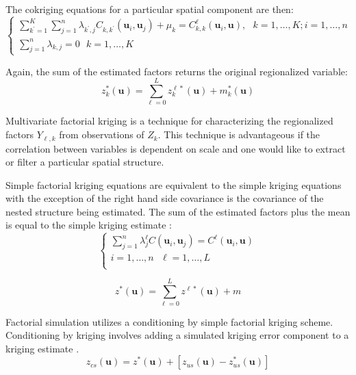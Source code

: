 The cokriging equations for a particular spatial component are then:
\begin{equation*}
    \begin{cases}
        \sum_{k^{\prime}=1}^{K} \sum_{j=1}^{n} \lambda_{k^{\prime},j} C_{k,k^{\prime}}(\mathbf{u}_{i}, \mathbf{u}_{j}) + \mu_{k} = C_{k,k}^{\ell}(\mathbf{u}_{i},\mathbf{u}), \ \ \ k=1,\dots,K; i=1,\dots,n \\
        \sum_{j=1}^{n} \lambda_{k,j} = 0  \ \ \ k=1,\dots,K
    \end{cases}
\end{equation*}

Again, the sum of the estimated factors returns the original regionalized variable:
\begin{equation*}
    z^{*}_{k}(\mathbf{u}) = \sum_{\ell=0}^{L} z^{\ell*}_{k}(\mathbf{u}) + m^{*}_{k}(\mathbf{u})
\end{equation*}

Multivariate factorial kriging is a technique for characterizing the regionalized factors $Y_{\ell,k}$ from observations of $Z_{k}$. This technique is advantageous if the correlation between variables is dependent on scale and one would like to extract or filter a particular spatial structure.

Simple factorial kriging equations are equivalent to the simple kriging equations with the exception of the right hand side covariance is the covariance of the nested structure being estimated. The sum of the estimated factors plus the mean is equal to the simple kriging estimate \citep{hong2007improved}:
\begin{equation*}
    \begin{cases}
        \sum_{j=1}^{n} \lambda_{j}^{\ell} C(\mathbf{u}_{i}, \mathbf{u}_{j}) = C^{\ell}(\mathbf{u}_{i}, \mathbf{u}) \\
        i=1,\dots,n \ \ \ \ell=1,\dots,L                                                                           \\
    \end{cases}
\end{equation*}

\begin{equation*}
    z^{*}(\mathbf{u}) = \sum_{\ell=0}^{L} z^{\ell*}(\mathbf{u}) + m
\end{equation*}

Factorial simulation utilizes a conditioning by simple factorial kriging scheme. Conditioning by kriging involves adding a simulated kriging error component to a kriging estimate \citep{chiles2012geostatistics}.
\begin{equation*}
    z_{cs}(\mathbf{u}) = z^{*}(\mathbf{u}) + [z_{us}(\mathbf{u}) - z_{us}^{*}(\mathbf{u})]
\end{equation*}

